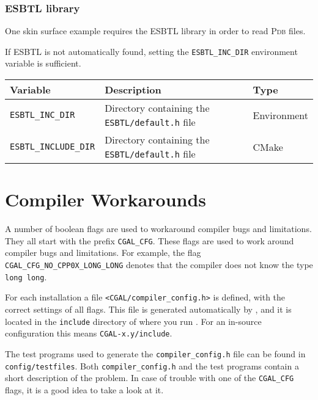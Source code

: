 \subsubsection{ESBTL library}

One skin surface example requires the ESBTL library in order to read \textsc{Pdb} files.

If ESBTL is not automatically found, setting the \texttt{ESBTL\_INC\_DIR} 
environment variable is sufficient.

{\ccTexHtml{\small}{}
\renewcommand{\arraystretch}{1.3}
\gdef\lcTabularBorder{2}
\begin{tabular}{|l|l|l|} \hline
  \textbf{Variable}                    & \textbf{Description}                                         & \textbf{Type}\\\hline\hline
  \texttt{ESBTL\_INC\_DIR}     & Directory containing the \texttt{ESBTL/default.h} file & Environment\\\hline
  \texttt{ESBTL\_INCLUDE\_DIR}     & Directory containing the \texttt{ESBTL/default.h} file & CMake\\\hline
\end{tabular}
}

\section{Compiler Workarounds}

A number of boolean flags are used to workaround compiler bugs and
limitations. They all start with the prefix \texttt{CGAL\_CFG}. These
flags are used to work around compiler bugs and limitations. For
example, the flag \texttt{CGAL\_CFG\_NO\_CPP0X\_LONG\_LONG} denotes
that the compiler does not know the type \texttt{long long}.

For each installation a file \texttt{<CGAL/compiler\_config.h>}
 is defined, with the correct
settings of all flags. This file is generated automatically by \cmake,
and it is located in the \texttt{include} directory of where you run
\cmake. For an in-source configuration this means
\texttt{CGAL-x.y/include}.

The test programs used to generate the \texttt{compiler\_config.h}
file can be found in \texttt{config/testfiles}.
 Both
\texttt{compiler\_config.h} and the test programs contain a short
description of the problem. In case of trouble with one of the
\texttt{CGAL\_CFG} flags, it is a good idea to take a look at it.

